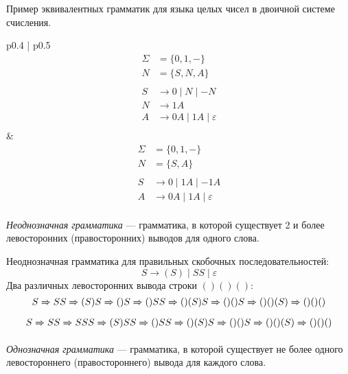 \begin{example}  Пример эквивалентных грамматик для языка целых чисел в двоичной системе счисления.

  \begin{tabular}{p{} | p{}}
  \[
  \begin{aligned}
    \Sigma & = \{ 0, 1, - \} \\
    N & = \{ S, N, A \} \\~\\
    S & \rightarrow 0 \mid N \mid - N  \\
    N & \rightarrow 1 A \\
    A & \rightarrow 0 A \mid 1 A  \mid \varepsilon\\
  \end{aligned}
  \]
    &
  \[
  \begin{aligned}
    \Sigma & = \{ 0, 1, - \} \\
    N & = \{ S, A \} \\~\\
    S & \rightarrow 0 \mid 1 A  \mid - 1 A  \\
    A & \rightarrow 0 A \mid 1 A  \mid \varepsilon\\
  \end{aligned}
  \]
  \end{tabular}

\end{example}


\begin{definition}
  \textit{Неоднозначная грамматика} --- грамматика, в которой существует 2 и более левосторонних (правосторонних) выводов для одного слова.
\end{definition}

\begin{example}
  Неоднозначная грамматика для правильных скобочных последовательностей:
\[
    S \to (S) \mid S S \mid \varepsilon
\]
Два различных левосторонних вывода строки $()()()$:
\[S \xRightarrow[]{} S S \xRightarrow[]{} (S) S \xRightarrow[]{} () S \xRightarrow[]{} () S S \xRightarrow[]{} () (S) S \xRightarrow[]{} () () S \xRightarrow[]{} () () (S) \xRightarrow[]{} () () ()\]
\[S \xRightarrow[]{} S S \xRightarrow[]{} S S S \xRightarrow[]{} (S) S S \xRightarrow[]{} () S S \xRightarrow[]{} () (S) S \xRightarrow[]{} () () S \xRightarrow[]{} () () (S) \xRightarrow[]{} () () ()\]
\end{example}

\begin{definition}
  \textit{Однозначная грамматика} --- грамматика, в которой существует не более одного левостороннего (правостороннего) вывода для каждого слова.
\end{definition}

